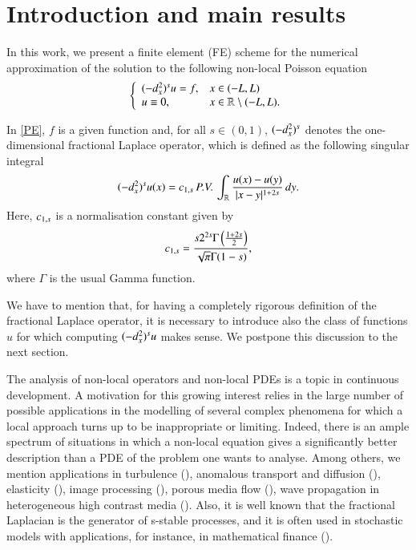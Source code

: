 \section{Introduction and main results}\label{intro_sec}

In this work, we present a finite element (FE) scheme for the numerical approximation of the solution to the following non-local Poisson equation
\begin{align}\label{PE}
	\left\{\begin{array}{ll}
		(-d_x^2)^{s}u = f, & x\in(-L,L)
		\\
		u\equiv 0, & x\in\mathbb{R}\setminus(-L,L).
	\end{array}\right.
\end{align}

In \eqref{PE}, $f$ is a given function and, for all $s\in(0,1)$, $(-d_x^2)^{s}$ denotes the one-dimensional fractional Laplace operator, which is defined as the following singular integral
\begin{align*}
	(-d_x^2)^{s}u(x) = c_{1,s}\,P.V.\,\int_{\mathbb{R}}\frac{u(x)-u(y)}{|x-y|^{1+2s}}\,dy. 
\end{align*}
Here, $c_{1,s}$ is a normalisation constant given by
\begin{align*}
	c_{1,s} = \frac{s2^{2s}\Gamma\left(\frac{1+2s}{2}\right)}{\sqrt{\pi}\Gamma(1-s)},
\end{align*}
where $\Gamma$ is the usual Gamma function. 

We have to mention that, for having a completely rigorous definition of the fractional Laplace operator, it is necessary to introduce also the class of functions $u$ for which computing $(-d_x^2)^{s}u$ makes sense. We postpone this discussion to the next section.

The analysis of non-local operators and non-local PDEs is a topic in continuous development.
A motivation for this growing interest relies in the large number of possible applications in the modelling of several complex phenomena for which a local approach turns up to be inappropriate or limiting.
Indeed, there is an ample spectrum of situations in which a non-local equation gives a
significantly better description than a PDE of the problem one wants to analyse.
Among others, we mention applications in turbulence (\cite{bakunin2008turbulence}), anomalous transport and diffusion (\cite{bologna2000anomalous,meerschaert2012fractional}), elasticity (\cite{dipierro2015dislocation}), image processing (\cite{gilboa2008nonlocal}), porous media flow (\cite{vazquez2012nonlinear}), wave propagation in heterogeneous high contrast media (\cite{zhu2014modeling}). Also, it is well known that the fractional Laplacian is the generator of s-stable processes, and it is often used in stochastic models with applications, for instance, in mathematical finance (\cite{levendorskii2004pricing,pham1997optimal}).

